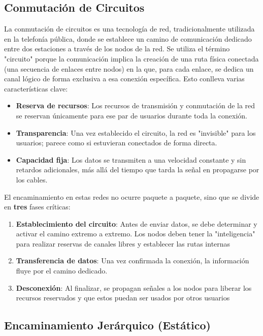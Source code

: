 \subsection{Conmutación de Circuitos}

La conmutación de circuitos es una tecnología de red, tradicionalmente utilizada en la telefonía pública, donde se establece un camino de comunicación dedicado entre dos estaciones a través de los nodos de la red. Se utiliza el término "circuito" porque la comunicación implica la creación de una ruta física conectada (una secuencia de enlaces entre nodos) en la que, para cada enlace, se dedica un canal lógico de forma exclusiva a esa conexión específica. Esto conlleva varias características clave:

\begin{itemize}
	\item \textbf{Reserva de recursos}: Los recursos de transmisión y conmutación de la red se reservan únicamente para ese par de usuarios durante toda la conexión.
	\item \textbf{Transparencia}: Una vez establecido el circuito, la red es "invisible" para los usuarios; parece como si estuvieran conectados de forma directa.
	\item \textbf{Capacidad fija}: Los datos se transmiten a una velocidad constante y sin retardos adicionales, más allá del tiempo que tarda la señal en propagarse por los cables.
\end{itemize}

El encaminamiento en estas redes no ocurre paquete a paquete, sino que se divide en \textbf{tres} fases críticas:

\begin{enumerate}
	\item \textbf{Establecimiento del circuito}: Antes de enviar datos, se debe determinar y activar el camino extremo a extremo. Los nodos deben tener la "inteligencia" para realizar reservas de canales libres y establecer las rutas internas
	\item \textbf{Transferencia de datos}: Una vez confirmada la conexión, la información fluye por el camino dedicado.
	\item \textbf{Desconexión}: Al finalizar, se propagan señales a los nodos para liberar los recursos reservados y que estos puedan ser usados por otros usuarios
\end{enumerate}

\subsection{Encaminamiento Jerárquico (Estático)}

